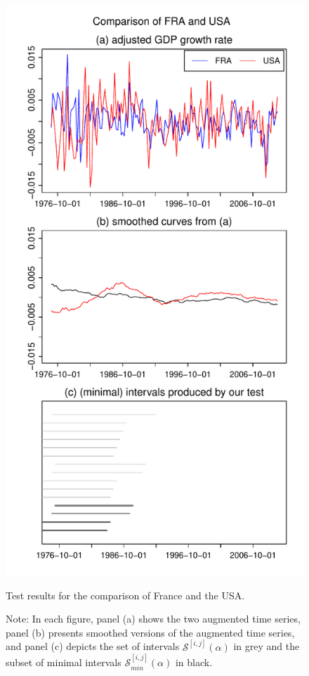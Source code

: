 \documentclass[a4paper,12pt]{article}
\begin{document}
\begin{figure}[p!]
\begin{minipage}[t]{0.49\textwidth}
\includegraphics[width=\textwidth]{Plots/FRA_vs_USA}
\caption{Test results for the comparison of France and the USA.}\label{fig:France:USA}
\end{minipage}
\caption*{Note: In each figure, panel (a) shows the two augmented time series, panel (b) presents smoothed versions of the augmented time series, and panel (c) depicts the set of intervals $\mathcal{S}^{[i,j]}(\alpha)$ in grey and the subset of minimal intervals $\mathcal{S}^{[i,j]}_{min}(\alpha)$ in black.}
\end{figure}
\end{document}
